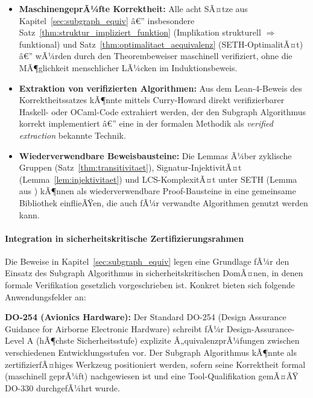 ﻿\documentclass[12pt,a4paper]{report}
\begin{document}
\begin{itemize}
    \item \textbf{MaschinengeprÃ¼fte Korrektheit:} Alle acht SÃ¤tze aus
          Kapitel~\ref{sec:subgraph_equiv} â€” insbesondere Satz~\ref{thm:struktur_impliziert_funktion}
          (Implikation strukturell $\Rightarrow$ funktional) und
          Satz~\ref{thm:optimalitaet_aequivalenz} (SETH-OptimalitÃ¤t) â€” wÃ¼rden durch
          den Theorembeweiser maschinell verifiziert, ohne die MÃ¶glichkeit menschlicher
          LÃ¼cken im Induktionsbeweis.
    \item \textbf{Extraktion von verifizierten Algorithmen:} Aus dem Lean-4-Beweis
          des Korrektheitssatzes kÃ¶nnte mittels Curry-Howard direkt verifizierbarer
          Haskell- oder OCaml-Code extrahiert werden, der den Subgraph Algorithmus
          korrekt implementiert â€” eine in der formalen Methodik als \textit{verified
          extraction} bekannte Technik.
    \item \textbf{Wiederverwendbare Beweisbausteine:} Die Lemmas Ã¼ber zyklische Gruppen
          (Satz~\ref{thm:transitivitaet}), Signatur-InjektivitÃ¤t (Lemma~\ref{lem:injektivitaet})
          und LCS-KomplexitÃ¤t unter SETH (Lemma aus \cite{subgraph2026}) kÃ¶nnen als
          wiederverwendbare Proof-Bausteine in eine gemeinsame Bibliothek einflieÃŸen,
          die auch fÃ¼r verwandte Algorithmen genutzt werden kann.
\end{itemize}

\paragraph{Integration in sicherheitskritische Zertifizierungsrahmen}

Die Beweise in Kapitel~\ref{sec:subgraph_equiv} legen eine Grundlage fÃ¼r den Einsatz
des Subgraph Algorithmus in sicherheitskritischen DomÃ¤nen, in denen formale
Verifikation gesetzlich vorgeschrieben ist. Konkret bieten sich folgende Anwendungsfelder an:

\textbf{DO-254 (Avionics Hardware):} Der Standard DO-254 (Design Assurance Guidance for
Airborne Electronic Hardware) schreibt fÃ¼r Design-Assurance-Level A (hÃ¶chste Sicherheitsstufe)
explizite Ã„quivalenzprÃ¼fungen zwischen verschiedenen Entwicklungsstufen vor. Der
Subgraph Algorithmus kÃ¶nnte als zertifizierfÃ¤higes Werkzeug positioniert werden, sofern
seine Korrektheit formal (maschinell geprÃ¼ft) nachgewiesen ist und eine
Tool-Qualifikation gemÃ¤ÃŸ DO-330 durchgefÃ¼hrt wurde.
\end{document}
